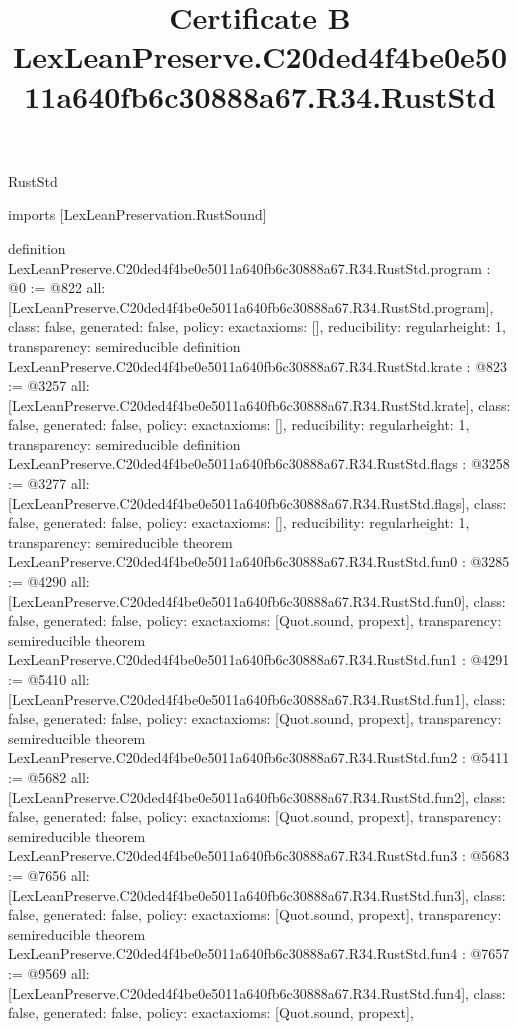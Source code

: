 \begin{lexlean}{RustStd}
\title{Certificate B LexLeanPreserve.C20ded4f4be0e5011a640fb6c30888a67.R34.RustStd}
\begin{coremodule}
imports [LexLeanPreservation.RustSound]

definition LexLeanPreserve.C20ded4f4be0e5011a640fb6c30888a67.R34.RustStd.program : @0 := @822 {
  all: [LexLeanPreserve.C20ded4f4be0e5011a640fb6c30888a67.R34.RustStd.program],
  class: false,
  generated: false,
  policy: exact{axioms: []},
  reducibility: regular{height: 1},
  transparency: semireducible
}
definition LexLeanPreserve.C20ded4f4be0e5011a640fb6c30888a67.R34.RustStd.krate : @823 := @3257 {
  all: [LexLeanPreserve.C20ded4f4be0e5011a640fb6c30888a67.R34.RustStd.krate],
  class: false,
  generated: false,
  policy: exact{axioms: []},
  reducibility: regular{height: 1},
  transparency: semireducible
}
definition LexLeanPreserve.C20ded4f4be0e5011a640fb6c30888a67.R34.RustStd.flags : @3258 := @3277 {
  all: [LexLeanPreserve.C20ded4f4be0e5011a640fb6c30888a67.R34.RustStd.flags],
  class: false,
  generated: false,
  policy: exact{axioms: []},
  reducibility: regular{height: 1},
  transparency: semireducible
}
theorem LexLeanPreserve.C20ded4f4be0e5011a640fb6c30888a67.R34.RustStd.fun0 : @3285 := @4290 {
  all: [LexLeanPreserve.C20ded4f4be0e5011a640fb6c30888a67.R34.RustStd.fun0],
  class: false,
  generated: false,
  policy: exact{axioms: [Quot.sound, propext]},
  transparency: semireducible
}
theorem LexLeanPreserve.C20ded4f4be0e5011a640fb6c30888a67.R34.RustStd.fun1 : @4291 := @5410 {
  all: [LexLeanPreserve.C20ded4f4be0e5011a640fb6c30888a67.R34.RustStd.fun1],
  class: false,
  generated: false,
  policy: exact{axioms: [Quot.sound, propext]},
  transparency: semireducible
}
theorem LexLeanPreserve.C20ded4f4be0e5011a640fb6c30888a67.R34.RustStd.fun2 : @5411 := @5682 {
  all: [LexLeanPreserve.C20ded4f4be0e5011a640fb6c30888a67.R34.RustStd.fun2],
  class: false,
  generated: false,
  policy: exact{axioms: [Quot.sound, propext]},
  transparency: semireducible
}
theorem LexLeanPreserve.C20ded4f4be0e5011a640fb6c30888a67.R34.RustStd.fun3 : @5683 := @7656 {
  all: [LexLeanPreserve.C20ded4f4be0e5011a640fb6c30888a67.R34.RustStd.fun3],
  class: false,
  generated: false,
  policy: exact{axioms: [Quot.sound, propext]},
  transparency: semireducible
}
theorem LexLeanPreserve.C20ded4f4be0e5011a640fb6c30888a67.R34.RustStd.fun4 : @7657 := @9569 {
  all: [LexLeanPreserve.C20ded4f4be0e5011a640fb6c30888a67.R34.RustStd.fun4],
  class: false,
  generated: false,
  policy: exact{axioms: [Quot.sound, propext]},
}
\end{coremodule}
\end{lexlean}
